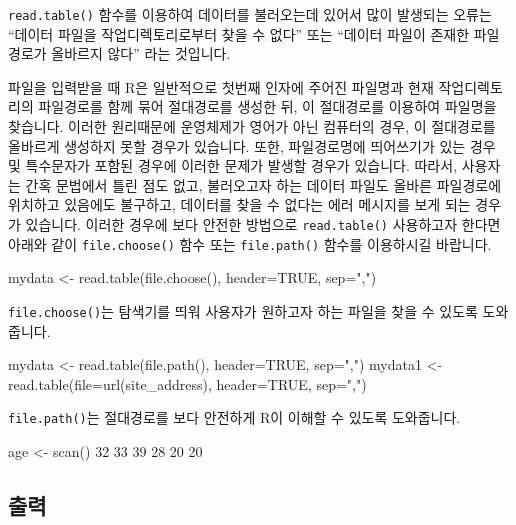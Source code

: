 \documentclass{book}
\begin{document}
\texttt{read.table()} 함수를 이용하여 데이터를 불러오는데 있어서 많이 발생되는 오류는 ``데이터 파일을 작업디렉토리로부터 찾을 수 없다'' 또는 ``데이터 파일이 존재한 파일경로가 올바르지 않다'' 라는 것입니다. 

파일을 입력받을 때 R은 일반적으로 첫번째 인자에 주어진 파일명과 현재 작업디렉토리의 파일경로를 함께 묶어 절대경로를 생성한 뒤, 이 절대경로를 이용하여 파일명을 찾습니다. 
이러한 원리때문에 운영체제가 영어가 아닌 컴퓨터의 경우, 이 절대경로를 올바르게 생성하지 못할 경우가 있습니다. 
또한, 파일경로명에 띄어쓰기가 있는 경우 및 특수문자가 포함된 경우에 이러한 문제가 발생할 경우가 있습니다. 
따라서, 사용자는 간혹 문법에서 틀린 점도 없고, 불러오고자 하는 데이터 파일도 올바른 파일경로에 위치하고 있음에도 불구하고, 데이터를 찾을 수 없다는 에러 메시지를 보게 되는 경우가 있습니다. 
이러한 경우에 보다 안전한 방법으로 \texttt{read.table()} 사용하고자 한다면 아래와 같이 \texttt{file.choose()} 함수 또는 \texttt{file.path()} 함수를 이용하시길 바랍니다.

\begin{Schunk}
\begin{Soutput}
mydata <- read.table(file.choose(), header=TRUE, sep=",")
\end{Soutput}
\end{Schunk}

\texttt{file.choose()}는 탐색기를 띄워 사용자가 원하고자 하는 파일을 찾을 수 있도록 도와줍니다. 

\begin{Schunk}
\begin{Soutput}
mydata <- read.table(file.path(), header=TRUE, sep=",")
mydata1 <- read.table(file=url(site_address), header=TRUE, sep=",")
\end{Soutput}
\end{Schunk}

\texttt{file.path()}는 절대경로를 보다 안전하게 R이 이해할 수 있도록 도와줍니다. 



\begin{Schunk}
\begin{Soutput}
age <- scan()
32 33 39 28 20 20

\end{Soutput}
\end{Schunk}


\subsection{출력}
\end{document}
